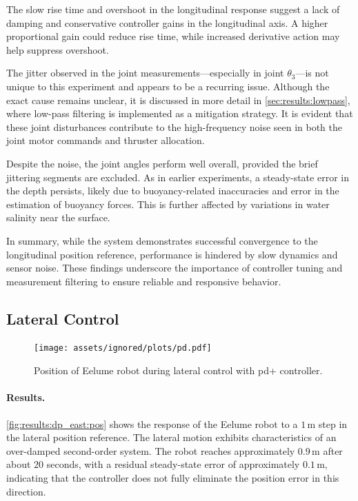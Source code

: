 The slow rise time and overshoot in the longitudinal response suggest a lack of damping and conservative controller gains in the longitudinal axis. A higher proportional gain could reduce rise time, while increased derivative action may help suppress overshoot.

The jitter observed in the joint measurements—especially in joint \(\theta_3\)—is not unique to this experiment and appears to be a recurring issue. Although the exact cause remains unclear, it is discussed in more detail in \autoref{sec:results:lowpass}, where low-pass filtering is implemented as a mitigation strategy. It is evident that these joint disturbances contribute to the high-frequency noise seen in both the joint motor commands and thruster allocation.

Despite the noise, the joint angles perform well overall, provided the brief jittering segments are excluded. As in earlier experiments, a steady-state error in the depth persists, likely due to buoyancy-related inaccuracies and error in the estimation of buoyancy forces. This is further affected by variations in water salinity near the surface.

In summary, while the system demonstrates successful convergence to the longitudinal position reference, performance is hindered by slow dynamics and sensor noise. These findings underscore the importance of controller tuning and measurement filtering to ensure reliable and responsive behavior.

\FloatBarrier

\subsection{Lateral Control}
\begin{figure}[!ht]
    \centering
    \texttt{[image: assets/ignored/plots/pd.pdf]}
    \caption{Position of Eelume robot during lateral control with \gls{pd+} controller.}
    \label{fig:results:dp_east:pos}
\end{figure}

\paragraph{Results.}

\autoref{fig:results:dp_east:pos} shows the response of the Eelume robot to a 
\(1\,\mathrm{m}\) step in the lateral position reference. The lateral motion 
exhibits characteristics of an over-damped second-order system. The robot 
reaches approximately \(0.9\,\mathrm{m}\) after about \(20\) seconds, with a 
residual steady-state error of approximately \(0.1\,\mathrm{m}\), indicating 
that the controller does not fully eliminate the position error in this 
direction.


